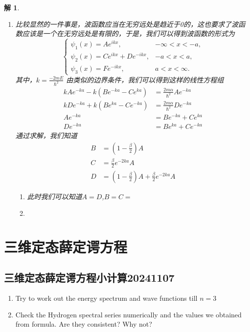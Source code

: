 \documentclass{article}
\newtheorem{solution}{解}
\begin{document}
\begin{solution}
\begin{enumerate}
\begin{enumerate}
            \item[(c)] 比较显然的一件事是，波函数应当在无穷远处是趋近于0的，这也要求了波函数应该是一个在无穷远处是有限的，于是，我们可以得到波函数的形式为
            \[
                \begin{cases}
                \psi_1\left(x\right)=Ae^{ikx},&-\infty<x<-a,\\
                \psi_2\left(x\right)=Ce^{ikx}+De^{-ikx},&-a<x<a,\\
                \psi_3\left(x\right)=Fe^{-ikx},&a<x<\infty.
                \end{cases}
            \]
            其中，$k=\frac{-2mE}{\hbar^{2}}$
            由类似的边界条件，我们可以得到这样的线性方程组
            \begin{align*}
                kAe^{-ka}-k\left(Be^{-ka}-Ce^{ka}\right)&=\frac{2m\alpha}{\hbar^{2}}Ae^{-ka} \\
                kDe^{-ka}+k\left(Be^{ka}-Ce^{-ka}\right)&=\frac{2m\alpha}{\hbar^{2}}De^{-ka} \\
                Ae^{-ka}&=Be^{-ka}+Ce^{ka} \\
                De^{-ka}&=Be^{ka}+Ce^{-ka} 
            \end{align*}
            通过求解，我们知道
            \begin{align*}
                B&=(1-\frac{\beta}{2})A\\
                C&=\frac{\beta}{2}e^{-2ka}A\\
                D&=(1-\frac{\beta}{2})A+\frac{\beta}{2}e^{-2ka}A
            \end{align*}
            \begin{enumerate}
                \item[$\alpha=\frac{\hbar^2}{ma}$] 此时我们可以知道$A=D$,$\displaystyle B=C=\frac{}{}$
                \item[$\alpha=\frac{\hbar^2}{4m\alpha}$] 
            \end{enumerate}
        \end{enumerate}
    \end{enumerate}
\end{solution}







\section{三维定态薛定谔方程}
\subsection{三维定态薛定谔方程小计算20241107}
\begin{enumerate}
    \item Try to work out the energy spectrum and wave functions till $n=3$
    \item Check the Hydrogen spectral series numerically and the values we obtained from formula. Are they consistent? Why not?
\end{enumerate}
\end{document}
